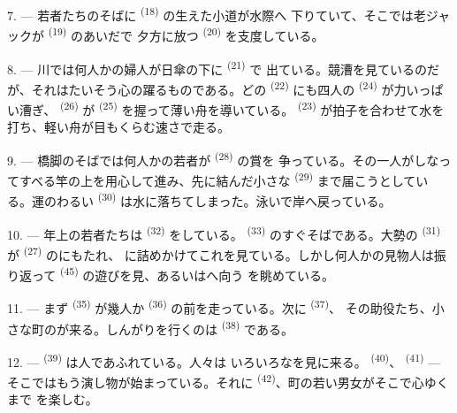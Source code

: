 7. --- 若者たちのそばに \textsuperscript{(18)} の生えた小道が水際へ
下りていて、そこでは老ジャックが \textsuperscript{(19)} のあいだで
夕方に放つ \textsuperscript{(20)} を支度している。

\VUsaut{4.4mm}
\VUsaut{3.4mm}

8. --- 川では何人かの婦人が日傘の下に \textsuperscript{(21)} で
出ている。競漕を見ているのだが、それはたいそう心の躍るものである。どの
 \textsuperscript{(22)} にも四人の \textsuperscript{(24)}
が力いっぱい漕ぎ、 \textsuperscript{(26)} が
\textsuperscript{(25)} を握って薄い舟を導いている。 \textsuperscript{(23)}
が拍子を合わせて水を打ち、軽い舟が目もくらむ速さで走る。

9. --- 橋脚のそばでは何人かの若者が \textsuperscript{(28)} の賞を
争っている。その一人がしなってすべる竿の上を用心して進み、先に結んだ小さな
 \textsuperscript{(29)} まで届こうとしている。運のわるい
\textsuperscript{(30)} は水に落ちてしまった。泳いで岸へ戻っている。

10. --- 年上の若者たちは \textsuperscript{(32)} をしている。
 \textsuperscript{(33)} のすぐそばである。大勢の
\textsuperscript{(31)} が \textsuperscript{(27)} のにもたれ、
に詰めかけてこれを見ている。しかし何人かの見物人は振り返って
 \textsuperscript{(45)} の遊びを見、あるいはへ向う
を眺めている。

11. --- まず \textsuperscript{(35)} が幾人か
\textsuperscript{(36)} の前を走っている。次に \textsuperscript{(37)}、
その助役たち、小さな町のが来る。しんがりを行くのは
 \textsuperscript{(38)} である。

\VUsaut{5.0mm}
\VUsaut{3.6mm}

12. ---  \textsuperscript{(39)} は人であふれている。人々は
いろいろなを見に来る。 \textsuperscript{(40)}、
 \textsuperscript{(41)} --- そこではもう演し物が始まっている。それに
 \textsuperscript{(42)}、町の若い男女がそこで心ゆくまで
を楽しむ。

